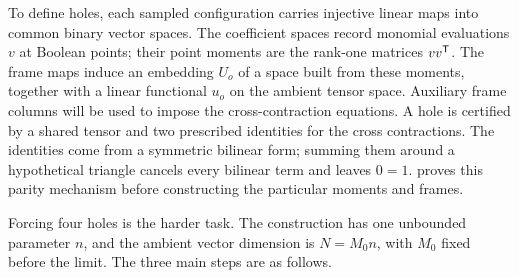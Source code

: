 To define holes, each sampled configuration carries injective linear
maps into common binary vector spaces. The coefficient spaces record
monomial evaluations \(v\) at Boolean points; their point moments
are the rank-one matrices \(vv^{\mathsf T}\). The frame maps induce an
embedding \(U_o\) of a space built from these moments, together with
a linear functional \(u_o\) on the ambient tensor space. Auxiliary
frame columns will be used to impose the cross-contraction equations.
A hole is certified by a shared tensor and two prescribed identities for the cross
contractions. The identities come from a symmetric bilinear form;
summing them around a hypothetical triangle cancels every bilinear
term and leaves \(0=1\).  proves this parity
mechanism before constructing the particular moments and frames.

Forcing four holes is the harder task. The construction has one
unbounded parameter \(n\), and the ambient vector dimension is
\(N=M_0n\), with \(M_0\) fixed before the limit. The three main
steps are as follows.


